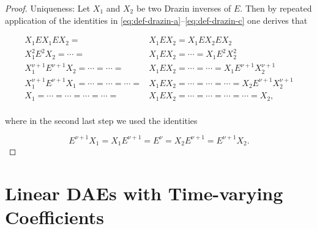 \documentclass[]{book}
\theoremstyle{definition}
\theoremstyle{definition}
\theoremstyle{definition}
\theoremstyle{remark}
\begin{document}
\begin{proof}
{}Uniqueness: Let \(X_1\) and \(X_2\) be two Drazin inverses of \(E\). Then by repeated application of the identities in \eqref{eq:def-drazin-a}--\eqref{eq:def-drazin-c} one derives that

\begin{align*}
X_1 EX_1 E X_2 =   &X_1EX_2 = X_1EX_2EX_2  \\
X_1^2 E^2 X_2 = \dotsm=   &X_1EX_2 = \dotsm= X_1E^2X_2^2  \\
X_1^{\nu+1}E^{\nu+1} X_2 =\dotsm=\dotsm=   &X_1EX_2 =\dotsm=\dotsm= X_1E^{\nu+1}X_2^{\nu+1}  \\
X_1^{\nu+1}E^{\nu+1} X_1 =\dotsm=\dotsm=\dotsm=   &X_1EX_2 =\dotsm=\dotsm=\dotsm= X_2E^{\nu+1}X_2^{\nu+1}  \\
X_1 =\dotsm=\dotsm=\dotsm=\dotsm=   &X_1EX_2 =\dotsm=\dotsm=\dotsm=\dotsm= X_2, \\
\end{align*}

where in the second last step we used the identities

\[
    E^{\nu+1}X_1=X_1E^{\nu+1}=E^{\nu}=X_2E^{\nu+1}=E^{\nu+1}X_2.
\]
\end{proof}

\newcommand{\rank}{\operatorname{rank}}
\newcommand{\kernel}{\operatorname{kernel}}
\newcommand{\corange}{\operatorname{corange}}
\newcommand{\range}{\operatorname{range}}
\newcommand{\cokernel}{\operatorname{cokernel}}

\hypertarget{linear-daes-with-time-varying-coefficients}{%
\chapter{Linear DAEs with Time-varying Coefficients}\label{linear-daes-with-time-varying-coefficients}}
\end{document}
